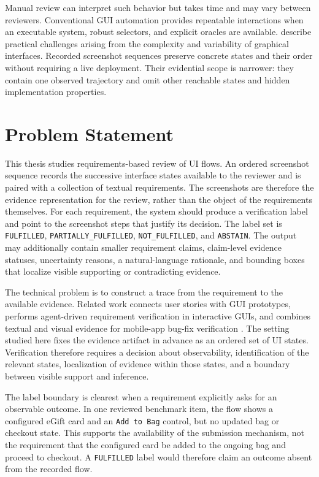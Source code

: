 Manual review can interpret such behavior but takes time and may vary between
reviewers. Conventional GUI automation provides repeatable interactions when
an executable system, robust selectors, and explicit oracles are available.
\textcite{nass2021} describe practical challenges arising from
the complexity and variability of graphical interfaces. Recorded screenshot
sequences preserve concrete states and their order without requiring a live
deployment. Their evidential scope is narrower: they contain one observed
trajectory and omit other reachable states and hidden implementation
properties.

\section{Problem Statement}\label{problem-statement}

This thesis studies requirements-based review of UI flows. An ordered screenshot sequence records the successive interface states available to the reviewer and is paired with a collection of textual requirements. The screenshots are therefore the evidence representation for the review, rather than the object of the requirements themselves. For each requirement, the system should produce a verification label and point to the screenshot steps that justify its decision. The label set is \texttt{FULFILLED}, \texttt{PARTIALLY\_\allowbreak FULFILLED}, \texttt{NOT\_FULFILLED}, and \texttt{ABSTAIN}. The output may additionally contain smaller requirement claims, claim-level evidence statuses, uncertainty reasons, a natural-language rationale, and bounding boxes that localize visible supporting or contradicting evidence.

The technical problem is to construct a trace from the requirement to the
available evidence. Related work connects user stories with GUI prototypes,
performs agent-driven requirement verification in interactive GUIs, and
combines textual and visual evidence for mobile-app bug-fix verification
\autocite{kretzer2025,kolthoff2025guispector,massenon2026}.
The setting studied here fixes the evidence artifact in advance as an ordered
set of UI states. Verification therefore requires a decision about
observability, identification of the relevant states, localization of evidence
within those states, and a boundary between visible support and inference.

The label boundary is clearest when a requirement explicitly asks for an
observable outcome. In one reviewed benchmark item, the flow shows a configured
eGift card and an \texttt{Add\ to\ Bag} control, but no updated bag or checkout state.
This supports the availability of the submission mechanism, not the requirement
that the configured card be added to the ongoing bag and proceed to checkout.
A \texttt{FULFILLED} label would therefore claim an outcome absent from the recorded
flow.

